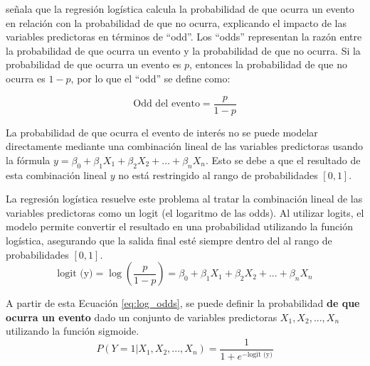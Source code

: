 \citet{park_introduction_2013} señala que la regresión logística calcula la probabilidad de que ocurra un evento en relación con la probabilidad de que no ocurra, explicando el impacto de las variables predictoras en términos de ``odd''. Los ``odds'' 
representan la razón entre la probabilidad de que ocurra un evento y la probabilidad de que no ocurra. Si la probabilidad de que ocurra un evento es $p$, entonces la probabilidad de que no ocurra es $1 - p$, por lo que el ``odd'' se define como:

\begin{equation}
    \text{Odd del evento} = \frac{p}{1 - p}
    \label{eq:odds}
\end{equation}

La probabilidad de que ocurra el evento de interés no se puede modelar directamente mediante una combinación lineal de las variables predictoras usando la fórmula $y = \beta_{0} + \beta_{1}X_{1} + \beta_{2}X_{2} + ... + \beta_{n}X_{n}$. Esto se debe a que el resultado de esta combinación lineal 
$y$ no está restringido al rango de probabilidades $[0, 1]$. 

La regresión logística resuelve este problema al tratar la combinación lineal de las variables predictoras como un logit (el logaritmo de las odds). Al utilizar logits, el modelo permite convertir el resultado en una probabilidad utilizando la función logística, asegurando que la salida final esté 
siempre dentro del al rango de probabilidades $[0, 1]$.
\begin{equation}
    \text{logit (y)} = \log\left(\frac{p}{1-p}\right) = \beta_{0} + \beta_{1}X_{1} + \beta_{2}X_{2} + ... + \beta_{n}X_{n}
    \label{eq:log_odds} 
\end{equation}    

A partir de esta Ecuación \ref{eq:log_odds}, se puede definir la probabilidad \textbf{de que ocurra un evento} dado un conjunto de variables predictoras $X_{1}, X_{2}, ..., X_{n}$ utilizando la función sigmoide. 
\begin{equation}
    P(Y = 1|X_{1},X_{2},...,X_{n}) = \frac{1}{1 + e^{-\text{logit (y)}}}
    \label{eq:lr}
\end{equation}

